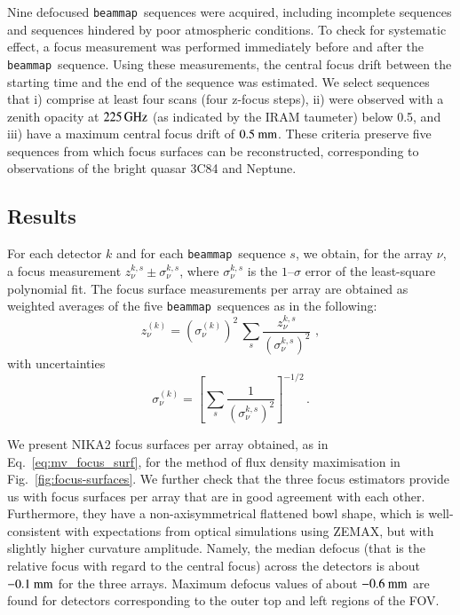 \documentclass[traditionalabstract]{aa}
\newcommand{\bm}{{\tt beammap}}
\newcommand{\taumeter}{taumeter}
\begin{document}
{\begin{appendix}
Nine defocused \bm\ sequences were acquired, including incomplete
sequences and sequences hindered by poor atmospheric conditions. To
check for systematic effect, a focus measurement was performed
immediately before and after the \bm\ sequence. Using these
measurements, the central focus drift between the starting time and the
end of the sequence was estimated. 
We select sequences that i) comprise at least four scans (four
z-focus steps), ii) were observed with a zenith opacity at $225\,\rm{GHz}$ (as indicated by
the IRAM \taumeter) below 0.5, and iii) have a maximum central focus
drift of $0.5~\rm{mm}$. These criteria preserve five sequences from which focus
surfaces can be reconstructed, %
corresponding to observations of the bright quasar 3C84 and Neptune.

\subsection{Results}
For each detector $k$ and for each \bm\ sequence $s$, we obtain, for
the array $\nu$, a focus measurement $z_\nu^{k, s} \pm \sigma_\nu^{k, s}$,
where $\sigma_\nu^{k, s}$ is the $1\mbox{--}\sigma$ error of the least-square
polynomial fit. The focus surface measurements per array are obtained
as weighted averages of the five \bm\ sequences as in the
following:
%
\begin{equation}
\label{eq:mv_focus_surf}
z_\nu^{(k)} = \left( \sigma_\nu^{(k)} \right)^2 \,  \sum_s \frac{z_\nu^{k,s}}{\left(\sigma_\nu^{k,s}\right)^2}\, \,  ,
\end{equation}
with uncertainties 
\begin{equation}
\label{eq:error_mv_focus_surf}
\sigma_\nu^{(k)} = \left[ \sum_s \frac{1}{\left(\sigma_\nu^{k,s}\right)^2}\right]^{-1/2}\, .
\end{equation}


We present NIKA2 focus surfaces per array obtained, as in
Eq.~\ref{eq:mv_focus_surf}, for the method of flux density maximisation  
in Fig.~\ref{fig:focus-surfaces}.
We further check that the three focus estimators provide
us with focus surfaces per array that are in good agreement with each
other. Furthermore, they have a non-axisymmetrical flattened bowl
shape, which is well-consistent with expectations from optical
simulations using ZEMAX, but with slightly higher curvature amplitude.
Namely, the median defocus (that is the relative focus with regard to the
central focus) across the detectors is about
$-0.1~\rm{mm}$ for the three arrays. Maximum defocus values of about
$-0.6~\rm{mm}$ are found for detectors corresponding to the outer top and
left regions of the FOV.


\end{appendix}}
\end{document}
